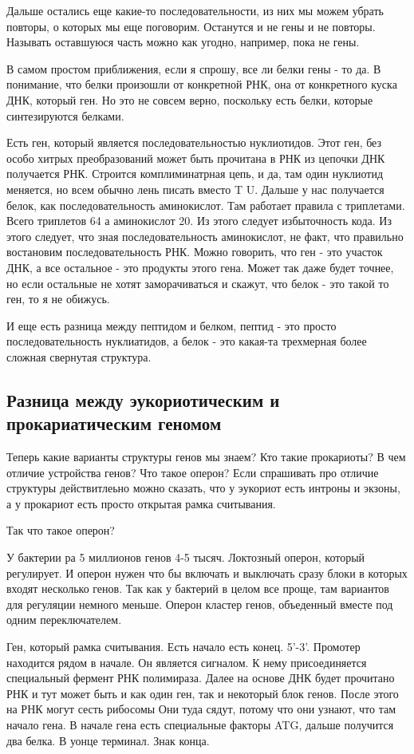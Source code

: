 Дальше остались еще какие-то последовательности, из 
них мы можем убрать повторы, о которых мы еще поговорим. Останутся и 
не гены и не повторы. Называть оставшуюся часть можно как угодно, 
например, пока не гены. 

В самом простом приближения, если я 
спрошу, все ли белки гены - то да. В понимание, что 
белки произошли от конкретной РНК, она от конкретного 
куска ДНК, который ген. Но это не совсем верно, 
поскольку есть белки, которые синтезируются белками. 

Есть ген, который является последовательностью нуклиотидов. 
Этот ген, без особо хитрых преобразований может быть прочитана 
в РНК из цепочки ДНК получается РНК. Строится комплиминатрная цепь, 
и да, там один нуклиотид меняется, но всем обычно лень писать 
вместо T U. Дальше у нас 
получается белок, как последовательность аминокислот. 
Там работает правила с триплетами. Всего 
триплетов 64 а аминокислот 20. Из этого 
следует избыточность кода. Из этого следует, что 
зная последовательность аминокислот, не факт, что правильно востановим 
последовательность РНК. Можно говорить, что ген - это участок ДНК,
а все остальное - это продукты этого гена. Может так даже будет точнее, 
но если остальные не хотят заморачиваться и скажут, что белок - это 
такой то ген, то я не обижусь. 

И еще есть разница между пептидом и белком, пептид - это просто 
последовательность нуклиатидов, а белок - это какая-та трехмерная 
более сложная свернутая структура. 

\subsection{Разница между эукориотическим и прокариатическим геномом}
Теперь какие варианты структуры генов мы знаем? 
Кто такие прокариоты? 
В чем отличие устройства генов? 
Что такое оперон? 
Если спрашивать про отличие структуры действитлеьно 
можно сказать, что у эукориот есть интроны и экзоны, 
а у прокариот есть просто 
открытая рамка считывания. 

Так что такое оперон? 

У бактерии ра 5 миллионов генов 4-5 тысяч. Локтозный оперон, 
который регулирует. И оперон нужен что бы включать и 
выключать сразу блоки в которых входят несколько генов. 
Так как у бактерий в целом все проще, там вариантов для регуляции немного 
меньше. Оперон кластер генов, объеденный вместе под одним переключателем. 

Ген, который рамка считывания. Есть начало есть конец. 5'-3'. Промотер 
находится рядом в начале. Он является сигналом. К нему присоединяется 
специальный фермент РНК полимираза.  Далее на основе ДНК будет прочитано 
РНК и тут может быть и как один ген, так и некоторый блок генов. После этого 
на РНК могут сесть рибосомы Они туда сядут, потому что они узнают, что 
там начало гена. В начале гена есть специальные факторы ATG, дальше 
получится два белка. В уонце терминал. Знак конца.

